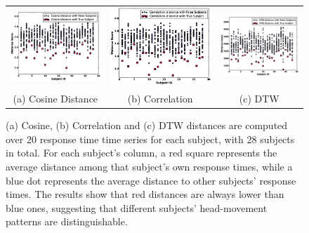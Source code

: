 \begin{figure}[t]
\begin{center}
\begin{tabular}{ccc}
\includegraphics [width=.31\linewidth]{figure/resp_time_cos.eps}&
\includegraphics [width=.31\linewidth]{figure/resp_time_cor.eps}&
\includegraphics [width=.31\linewidth]{figure/resp_time_dtw.eps}\\
(a) Cosine Distance & (b) Correlation & (c) DTW \\
\end{tabular}
\end{center}
\caption{\label{fig:distance} (a) Cosine, (b) Correlation and (c) DTW distances are computed over 20 response time time series for each subject, with 28 subjects in total. For each subject's column, a red square represents the average distance among that subject's own response times, while a blue dot represents the average distance to other subjects' response times. The results show that red distances are always lower than blue ones, suggesting that different subjects' head-movement patterns are distinguishable.}
\vspace{-2pt}
\end{figure}



